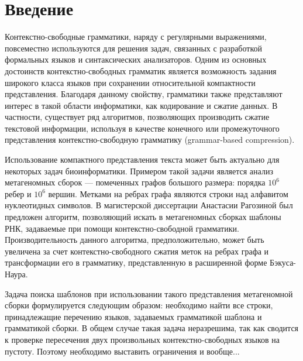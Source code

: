 \section*{Введение}

Контекстно-свободные грамматики, наряду с регулярными выражениями, повсеместно используются для решения задач, связанных с разработкой формальных языков и синтаксических анализаторов. Одним из основных достоинств контекстно-свободных грамматик является возможность задания широкого класса языков при сохранении относительной компактности представления. Благодаря данному свойству, грамматики также представляют интерес в такой области информатики, как кодирование и сжатие данных. В частности, существует ряд алгоритмов, позволяющих производить сжатие текстовой информации, используя в качестве конечного \cite{Sequitur} или промежуточного \cite{Arimura} представления контекстно-свободную грамматику (grammar-based compression).

Использование компактного представления текста может быть актуально для некоторых задач биоинформатики. Примером такой задачи является анализ метагеномных сборок --- помеченных графов большого размера: порядка $10^6$ ребер и $10^6$ вершин. Метками на ребрах графа являются строки над алфавитом нуклеотидных символов. В магистерской диссертации Анастасии Рагозиной \cite{Nastya} был предложен алгоритм, позволяющий искать в метагеномных сборках шаблоны РНК, задаваемые при помощи контекстно-свободной грамматики. Производительность данного алгоритма, предположительно, может быть увеличена за счет контекстно-свободного сжатия меток на ребрах графа и трансформации его в грамматику, представленную в расширенной форме Бэкуса-Наура.

Задача поиска шаблонов при использовании такого представления метагеномной сборки формулируется следующим образом: необходимо найти все строки, принадлежащие перечению языков, задаваемых грамматикой шаблона и грамматикой сборки. В общем случае такая задача неразрешима, так как сводится к проверке пересечения двух произвольных контекстно-свободных языков на пустоту. Поэтому необходимо выставить ограничения и вообще...